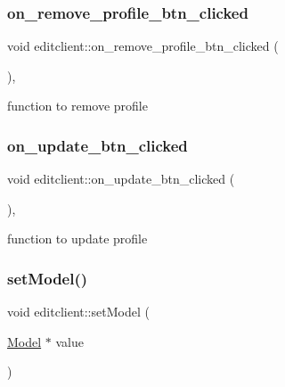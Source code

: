 \subsubsection{\texorpdfstring{on\+\_\+remove\+\_\+profile\+\_\+btn\+\_\+clicked}{on\_remove\_profile\_btn\_clicked}}
{\footnotesize\ttfamily void editclient\+::on\+\_\+remove\+\_\+profile\+\_\+btn\+\_\+clicked (\begin{DoxyParamCaption}{ }\end{DoxyParamCaption})\hspace{0.3cm}{\ttfamily [private]}, {\ttfamily [slot]}}



function to remove profile 

\mbox{\label{classeditclient_ab693a42ef8626fc5c856b69b8dcf4e35}} 
\subsubsection{\texorpdfstring{on\+\_\+update\+\_\+btn\+\_\+clicked}{on\_update\_btn\_clicked}}
{\footnotesize\ttfamily void editclient\+::on\+\_\+update\+\_\+btn\+\_\+clicked (\begin{DoxyParamCaption}{ }\end{DoxyParamCaption})\hspace{0.3cm}{\ttfamily [private]}, {\ttfamily [slot]}}



function to update profile 

\mbox{\label{classeditclient_a70e9ccebb55d8683339c90eb2eef1107}} 
\subsubsection{\texorpdfstring{set\+Model()}{setModel()}}
{\footnotesize\ttfamily void editclient\+::set\+Model (\begin{DoxyParamCaption}\item[{\hyperlink{classModel}{Model} $\ast$}]{value }\end{DoxyParamCaption})}



